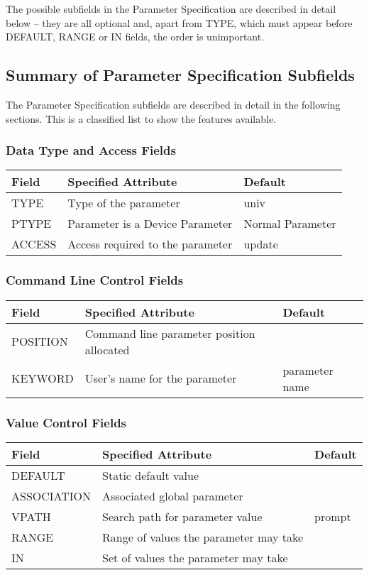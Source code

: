 The possible subfields in the Parameter Specification are described in detail
below -- they are all optional and, apart from
TYPE, which must appear before DEFAULT, RANGE or IN fields, the order
is unimportant.

\subsection{Summary of Parameter Specification Subfields}
The Parameter Specification subfields are described in detail in the following
sections. This is a classified list to show the features available.

\subsubsection*{Data Type and Access Fields}
\begin{center}
\begin{tabular}{|l|l|l|} \hline
Field & Specified Attribute & Default\\
\hline
TYPE & Type of the parameter & univ \\
PTYPE & Parameter is a Device Parameter & Normal Parameter \\
ACCESS & Access required to the parameter & update \\
\hline
\end{tabular}
\end{center}

\subsubsection*{Command Line Control Fields}
\begin{center}
\begin{tabular}{|l|l|l|} \hline
Field & Specified Attribute & Default\\
\hline
POSITION & Command line parameter position allocated & \\
KEYWORD & User's name for the parameter & parameter
name \\
\hline
\end{tabular}
\end{center}

\subsubsection*{Value Control Fields}
\begin{center}
\begin{tabular}{|l|l|l|} \hline
Field & Specified Attribute & Default\\
\hline
DEFAULT & Static default value & \\
ASSOCIATION & Associated global parameter & \\
VPATH & Search path for parameter value & prompt\\
RANGE & Range of values the parameter may take & \\
IN & Set of values the parameter may take & \\
\hline
\end{tabular}
\end{center}

